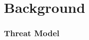 \chapter{Background}





\subsection{Threat Model}\label{subsec:interconnect-sc-threat-model}

\endinput